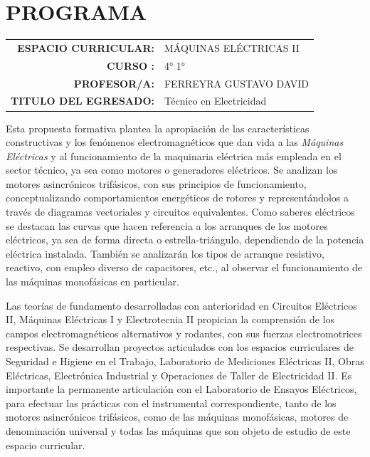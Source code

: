 \documentclass[planificacion2024.tex]{subfiles}
\begin{document}
\section*{\centering PROGRAMA}

\vspace{1cm}


\raggedright
\begin{tabular}{r l}
\textbf{ESPACIO CURRICULAR:}& MÁQUINAS ELÉCTRICAS II\\
\textbf{CURSO :}& 4° 1°\\
\textbf{PROFESOR/A:}    & FERREYRA GUSTAVO DAVID \\
\textbf{TITULO DEL EGRESADO:}&Técnico en Electricidad
\end{tabular}

\vspace{1cm}

Esta propuesta formativa plantea la apropiación de las características
constructivas y los fenómenos electromagnéticos que dan vida a las \emph{Máquinas
Eléctricas} y al funcionamiento de la maquinaria eléctrica más empleada en el sector
técnico, ya sea como motores o generadores eléctricos. Se analizan los motores
asincrónicos trifásicos, con sus principios de funcionamiento, conceptualizando
comportamientos energéticos de rotores y representándolos a través de diagramas
vectoriales y circuitos equivalentes. Como saberes eléctricos se destacan las curvas
que hacen referencia a los arranques de los motores eléctricos, ya sea de forma
directa o estrella-triángulo, dependiendo de la potencia eléctrica instalada. También se
analizarán los tipos de arranque resistivo, reactivo, con empleo diverso de capacitores,
etc., al observar el funcionamiento de las máquinas monofásicas en particular.

Las teorías de fundamento desarrolladas con anterioridad en Circuitos
Eléctricos II, Máquinas Eléctricas I y Electrotecnia II propician la comprensión de los
campos electromagnéticos alternativos y rodantes, con sus fuerzas electromotrices
respectivas. Se desarrollan proyectos articulados con los espacios curriculares
de Seguridad e Higiene en el Trabajo, Laboratorio de Mediciones Eléctricas II, Obras
Eléctricas, Electrónica Industrial y Operaciones de Taller de Electricidad II. Es
importante la permanente articulación con el Laboratorio de Ensayos Eléctricos, para
efectuar las prácticas con el instrumental correspondiente, tanto de los motores
asincrónicos trifásicos, como de las máquinas monofásicas, motores de denominación
universal y todas las máquinas que son objeto de estudio de este espacio curricular.
\end{document}
